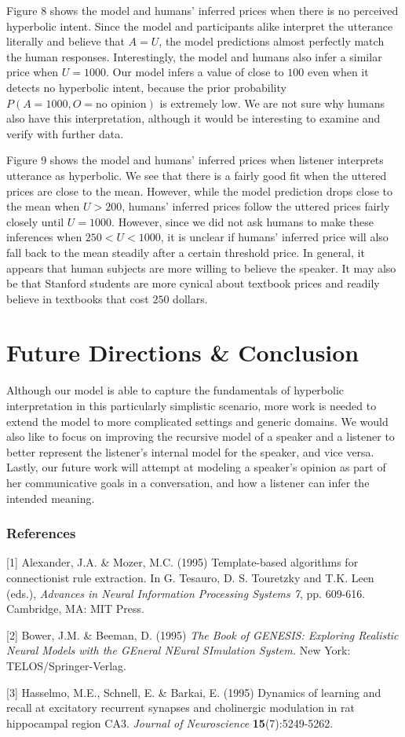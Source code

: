 \documentclass{article} %
\begin{document}
Figure 8 shows the model and humans' inferred prices when there is no perceived hyperbolic intent. Since the model and participants alike interpret the utterance literally and believe that $A = U$, the model predictions almost perfectly match the human responses. Interestingly, the model and humans also infer a similar price when $U = 1000$. Our model infers a value of close to $100$ even when it detects no hyperbolic intent, because the prior probability $P(A = 1000, O = \text{no opinion})$ is extremely low. We are not sure why humans also have this interpretation, although it would  be interesting to examine and verify with further data.


Figure 9 shows the model and humans' inferred prices when listener interprets utterance as hyperbolic. We see that there is a fairly good fit when the uttered prices are close to the mean. However, while the model prediction drops close to the mean when $U > 200$, humans' inferred prices follow the uttered prices fairly closely until $U = 1000$. However, since we did not ask humans to make these inferences when $ 250 < U < 1000$, it is unclear if humans' inferred price will also fall back to the mean steadily after a certain threshold price. In general, it appears that human subjects are more willing to believe the speaker. It may also be that Stanford students are more cynical about textbook prices and readily believe in textbooks that cost $250$ dollars.


\section{Future Directions \& Conclusion}
Although our model is able to capture the fundamentals of hyperbolic interpretation in this particularly simplistic scenario, more work is needed to extend the model to more complicated settings and generic domains. We would also like to focus on improving the recursive model of a speaker and a listener to better represent the listener's internal model for the speaker, and vice versa. Lastly, our future work will attempt at modeling a speaker's opinion as part of her communicative goals in a conversation, and how a listener can infer the intended meaning.

\subsubsection*{References}

\small{
[1] Alexander, J.A. \& Mozer, M.C. (1995) Template-based algorithms
for connectionist rule extraction. In G. Tesauro, D. S. Touretzky
and T.K. Leen (eds.), {\it Advances in Neural Information Processing
Systems 7}, pp. 609-616. Cambridge, MA: MIT Press.

[2] Bower, J.M. \& Beeman, D. (1995) {\it The Book of GENESIS: Exploring
Realistic Neural Models with the GEneral NEural SImulation System.}
New York: TELOS/Springer-Verlag.

[3] Hasselmo, M.E., Schnell, E. \& Barkai, E. (1995) Dynamics of learning
and recall at excitatory recurrent synapses and cholinergic modulation
in rat hippocampal region CA3. {\it Journal of Neuroscience}
{\bf 15}(7):5249-5262.
}



\setlength{\bibleftmargin}{.125in}
\setlength{\bibindent}{-\bibleftmargin}


\end{document}
